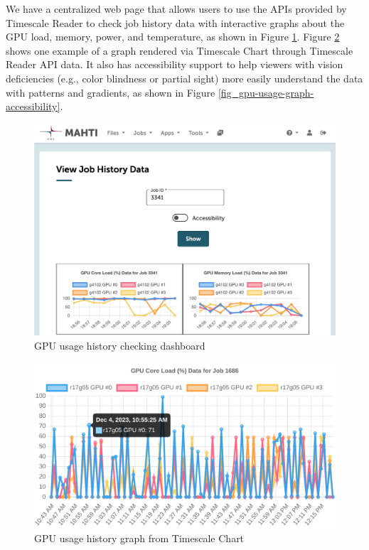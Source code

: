 We have a centralized web page that allows users to use the APIs provided by Timescale Reader to check job history data with interactive graphs about the GPU load, memory, power, and temperature, as shown in Figure \ref{fig_gpu-usage-history-dashboard}. Figure \ref{fig_gpu-usage-graph} shows one example of a graph rendered via Timescale Chart through Timescale Reader API data. It also has accessibility support to help viewers with vision deficiencies (e.g., color blindness or partial sight) more easily understand the data with patterns and gradients, as shown in Figure \ref{fig_gpu-usage-graph-accessibility}.

\begin{figure}[H]
    \centering
    \includegraphics[width=1\textwidth]{figures/data-dashboard.png}
    \caption{GPU usage history checking dashboard}
    \label{fig_gpu-usage-history-dashboard}
\end{figure}

\begin{figure}[H]
    \centering
    \includegraphics[width=1\textwidth]{figures/usage-graph.png}
    \caption{GPU usage history graph from Timescale Chart}
    \label{fig_gpu-usage-graph}
\end{figure}

